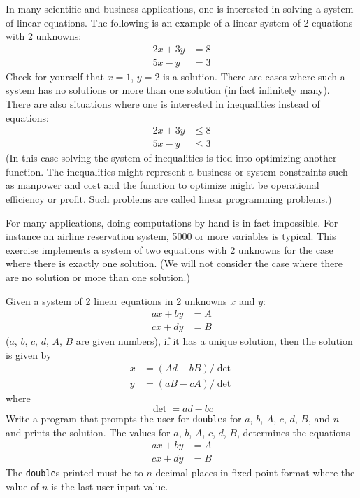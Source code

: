 In many scientific and business applications, one is interested in solving a 
system of linear
equations. 
The following is an example of a linear system of 2 equations with 2 unknowns:
\begin{align*}
2x + 3y &= 8 \\
5x - y &= 3
\end{align*}
Check for yourself that $x = 1$, $y = 2$ is a solution. 
There are cases where such a system has no
solutions or more than one solution (in fact infinitely many). There are also situations where one is
interested in inequalities instead of equations:
\begin{align*}
2x + 3y &\leq 8 \\
5x -  y &\leq 3
\end{align*}
(In this case solving the system of inequalities is tied into optimizing 
another function. 
The inequalities
might represent a business or system constraints such as manpower and cost 
and the function to
optimize might be operational efficiency or profit. Such problems are called linear programming
problems.)

For many applications, doing computations by hand is in fact impossible. 
For instance an airline
reservation system, 5000 or more variables is typical. 
This exercise implements a system of two
equations with 2 unknowns for the case where there is exactly one solution. 
(We will not consider the
case where there are no solution or more than one solution.)

Given a system of 2 linear equations in 2 unknowns $x$ and $y$:
\begin{align*}
ax + by &= A \\
cx + dy &= B
\end{align*}
($a$, $b$, $c$, $d$, $A$, $B$ are given numbers), 
if it has a unique solution, then the solution is given by
\begin{align*}
x &= (Ad - bB) / \operatorname{det} \\
y &= (aB - cA) / \operatorname{det}
\end{align*}
where
\[
\operatorname{det} = ad - bc
\]
Write a program that prompts the user for \texttt{double}s for 
$a$, $b$, $A$, $c$, $d$, $B$, and $n$ and prints the solution. The
values for $a$, $b$, $A$, $c$, $d$, $B$,
determines the equations
\begin{align*}
ax + by &= A \\
cx + dy &= B
\end{align*}
The \texttt{double}s
printed must be to $n$ decimal places in fixed point format 
where the value of $n$ is the last
user-input value.

